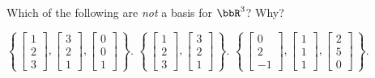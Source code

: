 \begin{questions}
  \vspace{15em}
  \question Which of the following are \emph{not} a basis for $\bbR^3$?
  Why?
  \begin{choices}
    \choice
    $\displaystyle\left\{\,
      \begin{bmatrix}1\\2\\3\end{bmatrix},
      \begin{bmatrix}3\\2\\1\end{bmatrix},
      \begin{bmatrix}0\\0\\1\end{bmatrix}
      \,\right\}$.
    \choice
    $\displaystyle\left\{\,
      \begin{bmatrix}1\\2\\3\end{bmatrix},
      \begin{bmatrix}3\\2\\1\end{bmatrix}
      \,\right\}$.
    \choice
    $\displaystyle\left\{\,
      \begin{bmatrix}0\\2\\-1\end{bmatrix},
      \begin{bmatrix}1\\1\\1\end{bmatrix},
      \begin{bmatrix}2\\5\\0\end{bmatrix}
      \,\right\}$.
  \end{choices}
\end{questions}

